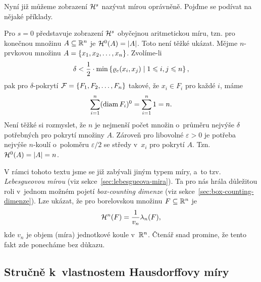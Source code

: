 Nyní již můžeme zobrazení $\mathcal{H}^{s}$ nazývat mírou oprávněně. Pojďme se podívat na nějaké příklady.
\begin{example}
    Pro $s=0$ představuje zobrazení $\mathcal{H}^{s}$ obyčejnou aritmetickou míru, tzn. pro konečnou množinu $A\subseteq\mathbb{R}^n$ je $\mathcal{H}^{0}(A)=|A|$. Toto není těžké ukázat. Mějme $n$-prvkovou množinu $A=\left\{x_1,x_2,\ldots,x_n\right\}$. Zvolíme-li
    \[\delta<\dfrac{1}{2}\cdot\min\left\{\varrho_e(x_i,x_j)\mid 1\leqslant i,j\leqslant n\right\},\]
    pak pro $\delta$-pokrytí $\mathcal{F}=\left\{F_1,F_2,\ldots,F_n\right\}$ takové, že $x_i\in F_i$ pro každé $i$, máme
    \[\sum_{i=1}^{n}(\operatorname{diam}{F_i})^0=\sum_{i=1}^{n}1=n.\]
    Není těžké si rozmyslet, že $n$ je nejmenší počet množin o~průměru nejvýše $\delta$ potřebných pro pokrytí množiny $A$. Zároveň pro libovolné $\varepsilon>0$ je potřeba nejvýše $n$-koulí o~poloměru $\varepsilon/2$ se středy v~$x_i$ pro pokrytí $A$. Tzn.~$\mathcal{H}^{0}(A)=|A|=n$.
\end{example}

V rámci tohoto textu jsme se již zabývali jiným typem míry, a~to tzv. \emph{Lebesgueovou mírou} (viz sekce~\ref{sec:lebesgueova-mira}). Ta pro nás hrála důležitou roli v~jednom možném pojetí \emph{box-counting dimenze} (viz sekce~\ref{sec:box-counting-dimenze}). Lze ukázat, že pro borelovskou množinu $F\subseteq\mathbb{R}^n$ je
\[\mathcal{H}^{n}(F)=\dfrac{1}{v_n}\lambda_n(F),\]
kde $v_n$ je objem (míra) jednotkové koule v~$\mathbb{R}^n$. Čtenář snad promine, že tento fakt zde ponecháme bez důkazu. \citep[str. 45]{Falconer2014}

\subsection{Stručně k~vlastnostem Hausdorffovy míry}\label{subsec:vlastnosti-hausdorffovy-miry}

